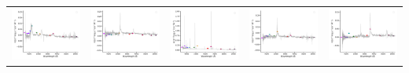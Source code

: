 \begin{center}
\begin{longtable}{l l l l l }
    \includegraphics[width=0.2\linewidth, clip]{Figs/Figs-sdss/spec-4202-55445-0409-SPLUS-s02s09-042917.pdf} & \includegraphics[width=0.2\linewidth, clip]{Figs/Figs-sdss/spec-4204-55470-0588-STRIPE82-0142-034401.pdf} & \includegraphics[width=0.2\linewidth, clip]{Figs/Figs-sdss/spec-4205-55454-0490-STRIPE82-0143-027848.pdf} & \includegraphics[width=0.2\linewidth, clip]{Figs/Figs-sdss/spec-4206-55471-0352-STRIPE82-0147-043690.pdf} & \includegraphics[width=0.2\linewidth, clip]{Figs/Figs-sdss/spec-4217-55478-0338-STRIPE82-0003-028018.pdf} \\

\end{longtable}
\end{center}
